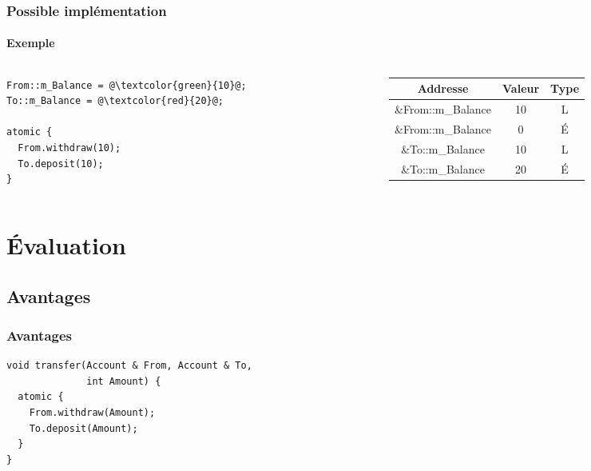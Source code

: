\documentclass{beamer}
\begin{document}
\begin{frame}[fragile]
\frametitle{Possible implémentation}
\framesubtitle{Exemple}
\begin{columns}
    \begin{column}{0.48\textwidth}
        \begin{lstlisting}
From::m_Balance = @\textcolor{green}{10}@;
To::m_Balance = @\textcolor{red}{20}@;       
        
atomic {
  From.withdraw(10);
  To.deposit(10);
}
\end{lstlisting}
    \end{column}
    \begin{column}{0.55\textwidth}
        \begin{tabular}{ | c | c | c | }
  \hline
  Addresse & Valeur & Type \\
  \hline
  \rowcolor{DGreen}\&From::m\_Balance & 10 & L \\
  \hline
  \&From::m\_Balance & 0 & É \\
  \hline
  \rowcolor{red}\&To::m\_Balance & 10 & L \\
  \hline
  \&To::m\_Balance & 20 & É \\
  \hline
\end{tabular}
    \end{column}
\end{columns}
\end{frame}

\section{Évaluation}
\subsection{Avantages}
\begin{frame}[fragile]
\frametitle{Avantages}
\begin{adjustbox}{width=\textwidth,height=\someheight,keepaspectratio}
\begin{lstlisting}
void transfer(Account & From, Account & To, 
              int Amount) {
  atomic {
    From.withdraw(Amount);
    To.deposit(Amount);
  }
}
\end{lstlisting}
\end{adjustbox}
\end{frame}
\end{document}
